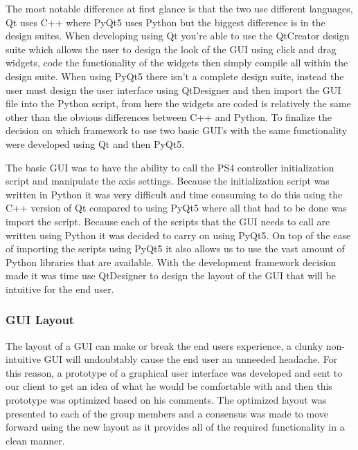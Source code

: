 The most notable difference at first glance is that the two use different languages, Qt uses C++ where PyQt5 uses Python but the biggest difference is in the design suites. When developing using Qt you're able to use the QtCreator design suite which allows the user to design the look of the GUI using click and drag widgets, code the functionality of the widgets then simply compile all within the design suite. When using PyQt5 there isn't a complete design suite, instead the user must design the user interface using QtDesigner and then import the GUI file into the Python script, from here the widgets are coded is relatively the same other than the obvious differences between C++ and Python. To finalize the decision on which framework to use two basic GUI's with the same functionality were developed using Qt and then PyQt5. 

The basic GUI was to have the ability to call the PS4 controller initialization script and manipulate the axis settings. Because the initialization script was written in Python it was very difficult and time consuming to do this using the C++ version of Qt compared to using PyQt5 where all that had to be done was import the script. Because each of the scripts that the GUI needs to call are written using Python it was decided to carry on using PyQt5. On top of the ease of importing the scripts using PyQt5 it also allows us to use the vast amount of Python libraries that are available. With the development framework decision made it was time use QtDesigner to design the layout of the GUI that will be intuitive for the end user.

\subsubsection{GUI Layout}  
The layout of a GUI can make or break the end users experience, a clunky non-intuitive GUI will undoubtably cause the end user an unneeded headache. For this reason, a prototype of a graphical user interface was developed and sent to our client to get an idea of what he would be comfortable with and then this prototype was optimized based on his comments. The optimized layout was presented to each of the group members and a consensus was made to move forward using the new layout as it provides all of the required functionality in a clean manner. 

